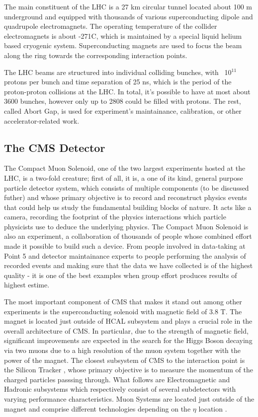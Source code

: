 The main constituent of the LHC is a 27 km circular tunnel located about 100 m underground and equipped with thousands of various superconducting dipole and quadrupole electromagnets. The operating temperature of the collider electromagnets is about -271\textdegree{}C, which is maintained by a special liquid helium based cryogenic system. Superconducting magnets are used to focus the beam along the ring towards the corresponding interaction points.

The LHC beams are structured into individual colliding bunches, with ~10$^{11}$ protons per bunch and time separation of 25 ns, which is the period of the proton-proton collisions at the LHC. In total, it's possible to have at most about 3600 bunches, however only up to 2808 could be filled with protons. The rest, called Abort Gap, is used for experiment's maintainance, calibration, or other accelerator-related work.

\subsection{The CMS Detector} \label{subsection:higgs_cms_generaldescription}
The Compact Muon Solenoid, one of the two largest experiments hosted at the LHC, is a two-fold creature; first of all, it is, a one of its kind, general purpose particle detector system, which consists of multiple components (to be discussed futher) and whose primary objective is to record and reconstruct physics events that could help us study the fundamental building blocks of nature. It acts like a camera, recording the footprint of the physics interactions which particle physicists use to deduce the underlying physics. The Compact Muon Solenoid is also an experiment, a collaboration of thousands of people whose combined effort made it possible to build such a device. From people involved in data-taking at Point 5 and detector maintainance experts to people performing the analysis of recorded events and making sure that the data we have collected is of the highest quality - it is one of the best examples when group effort produces results of highest estime.

The most important component of CMS that makes it stand out among other experiments is the superconducting solenoid with magnetic field of 3.8 T. The magnet is located just outside of HCAL subsystem and plays a crucial role in the overall architecture of CMS. In particular, due to the strength of magnetic field, significant improvements are expected in the search for the Higgs Boson decaying via two muons due to a high resolution of the muon system together with the power of the magnet. The closest subsystem of CMS to the interaction point is the Silicon Tracker \cite{Tracker}, whose primary objective is to measure the momentum of the charged particles passsing through. What follows are Electromagnetic \cite{ECAL} and Hadronic \cite{HCAL} subsystems which respectively consist of several subdetectors with varying performance characteristics. Muon Systems are located just outside of the magnet and comprise different technologies depending on the $\eta$ location \cite{Muon}.

